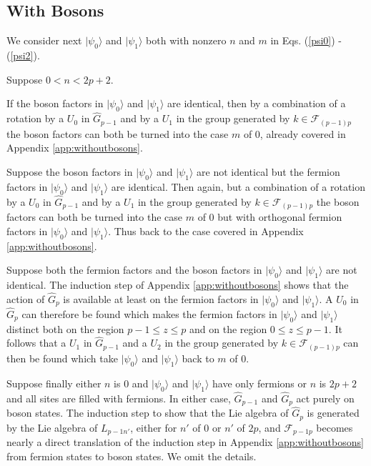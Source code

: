 \documentclass[12pt,amsmath,amssymb,onecolumn]{revtex4-2}
\begin{document}
\subsection{\label{app:withbosons} With Bosons}

We consider next $|\psi_0 \rangle $ and $|\psi_1 \rangle $ both with nonzero $n$ and $m$ in Eqs. (\ref{psi0}) - (\ref{psi2}).

Suppose $0 < n < 2 p + 2$.

If the boson factors in $|\psi_0 \rangle $ and $|\psi_1 \rangle $ are identical, then by a combination of
a rotation by a $U_0$ in $\hat{G}_{p-1}$ and by a $U_1$ in the group generated by $k \in \mathcal{F}_{(p-1) p}$
the boson factors can both be turned into the case $m$ of 0, already covered in Appendix \ref{app:withoutbosons}.

Suppose the boson factors in $|\psi_0 \rangle $ and $|\psi_1 \rangle $ are not identical but the fermion factors
in $|\psi_0 \rangle $ and $|\psi_1 \rangle $ are identical.  Then again, but a combination of
a rotation by a $U_0$ in $\hat{G}_{p-1}$ and by a $U_1$ in the group generated by $k \in \mathcal{F}_{(p-1) p}$
the boson factors can both be turned into the case $m$ of 0 but
with orthogonal fermion factors in $|\psi_0 \rangle $ and $|\psi_1 \rangle $. Thus back to
the case covered in Appendix \ref{app:withoutbosons}.

Suppose both the fermion factors and the boson factors
in $|\psi_0 \rangle $ and $|\psi_1 \rangle $ are not identical. The induction step of
Appendix \ref{app:withoutbosons} shows that the action of $\hat{G}_p$ is
available at least on the fermion factors in $|\psi_0 \rangle $ and $|\psi_1 \rangle $.
A $U_0$ in $\hat{G}_p$ can therefore be found which makes the fermion factors in
$|\psi_0 \rangle $ and $|\psi_1 \rangle $ distinct both on the region $p-1 \le z \le p$
and on the region $0 \le z \le p - 1$. It follows that a $U_1$ in $\hat{G}_{p-1}$
and a $U_2$ in the group generated by $k \in \mathcal{F}_{(p-1) p}$ can then be found
which take $|\psi_0 \rangle $ and $|\psi_1 \rangle $ back to $m$ of 0.

Suppose finally either $n$ is 0 and $|\psi_0 \rangle $ and $|\psi_1 \rangle $ have only fermions
or $n$ is $2 p + 2$ and all sites are filled with fermions. In either case,
$\hat{G}_{p-1}$ and $\hat{G}_p$ act purely on boson states. The induction
step to show that the Lie algebra of $\hat{G}_p$ is generated by 
the Lie algebra of 
$L_{p-1 n'}$, either for $n'$ of 0 or $n'$ of $2 p$, and $\mathcal{F}_{p-1 p}$
becomes nearly a direct translation of the induction step in Appendix \ref{app:withoutbosons}
from fermion states to boson states. We omit the details.
\end{document}
